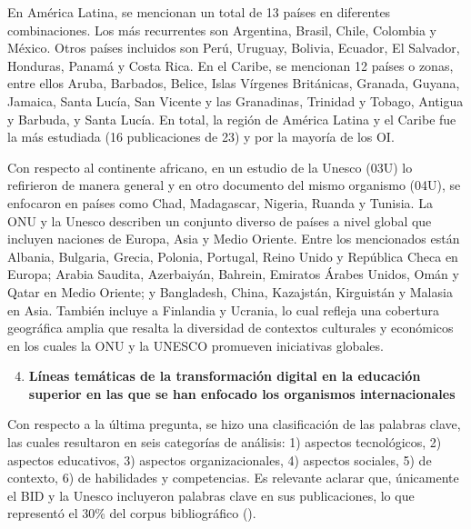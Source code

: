 En América Latina, se mencionan un total de 13 países en diferentes
combinaciones. Los más recurrentes son Argentina, Brasil, Chile,
Colombia y México. Otros países incluidos son Perú, Uruguay, Bolivia,
Ecuador, El Salvador, Honduras, Panamá y Costa Rica. En el Caribe, se
mencionan 12 países o zonas, entre ellos Aruba, Barbados, Belice, Islas
Vírgenes Británicas, Granada, Guyana, Jamaica, Santa Lucía, San Vicente
y las Granadinas, Trinidad y Tobago, Antigua y Barbuda, y Santa Lucía.
En total, la región de América Latina y el Caribe fue la más estudiada
(16 publicaciones de 23) y por la mayoría de los OI.

Con respecto al continente africano, en un estudio de la Unesco (03U) lo
refirieron de manera general y en otro documento del mismo organismo
(04U), se enfocaron en países como Chad, Madagascar, Nigeria, Ruanda y
Tunisia. La ONU y la Unesco describen un conjunto diverso de países a
nivel global que incluyen naciones de Europa, Asia y Medio Oriente.
Entre los mencionados están Albania, Bulgaria, Grecia, Polonia,
Portugal, Reino Unido y República Checa en Europa; Arabia Saudita,
Azerbaiyán, Bahrein, Emiratos Árabes Unidos, Omán y Qatar en Medio
Oriente; y Bangladesh, China, Kazajstán, Kirguistán y Malasia en Asia.
También incluye a Finlandia y Ucrania, lo cual refleja una cobertura
geográfica amplia que resalta la diversidad de contextos culturales y
económicos en los cuales la ONU y la UNESCO promueven iniciativas
globales.

\begin{enumerate}[label=\textbf{PI\arabic*}]
\setcounter{enumi}{3}
\item
  \textbf{Líneas temáticas de la transformación digital en la educación
  superior en las que se han enfocado los organismos internacionales}
\end{enumerate}

Con respecto a la última pregunta, se hizo una clasificación de las
palabras clave, las cuales resultaron en seis categorías de análisis: 1)
aspectos tecnológicos, 2) aspectos educativos, 3) aspectos
organizacionales, 4) aspectos sociales, 5) de contexto, 6) de
habilidades y competencias. Es relevante aclarar que, únicamente el BID
y la Unesco incluyeron palabras clave en sus publicaciones, lo que
representó el 30\% del corpus bibliográfico ().


